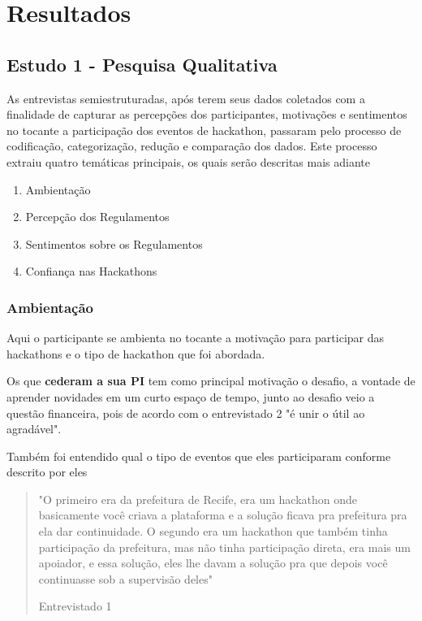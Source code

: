 \chapter{Resultados}
\label{chp:resultados}

\section{Estudo 1 - Pesquisa Qualitativa}

As entrevistas semiestruturadas, após terem seus dados coletados com a finalidade de capturar as percepções dos participantes, motivações e sentimentos no tocante a participação dos eventos de hackathon, passaram pelo processo de codificação, categorização, redução e comparação dos dados. Este processo extraiu quatro temáticas principais, os quais serão descritas mais adiante
\begin{enumerate}
    \item Ambientação 
    \item Percepção dos Regulamentos
    \item Sentimentos sobre os Regulamentos
    \item Confiança nas Hackathons
\end{enumerate}



\subsection{Ambientação}
Aqui o participante se ambienta no tocante a motivação para participar das hackathons e o tipo de hackathon que foi abordada.

Os que \textbf{cederam a sua PI} tem como principal motivação o desafio, a vontade de aprender novidades em um curto espaço de tempo, junto ao desafio veio a questão financeira, pois de acordo com o entrevistado 2 "é unir o útil ao agradável".

Também foi entendido qual o tipo de eventos que eles participaram conforme descrito por eles

\begin{quote}
    "O primeiro era da prefeitura de Recife, era um hackathon onde basicamente você criava a plataforma e a solução ficava pra prefeitura pra ela dar continuidade. O segundo era um hackathon que também tinha participação da prefeitura, mas não tinha participação direta, era mais um apoiador, e essa solução, eles lhe davam a solução pra que depois você continuasse sob a supervisão deles"
    
    \flushright Entrevistado 1
\end{quote}

